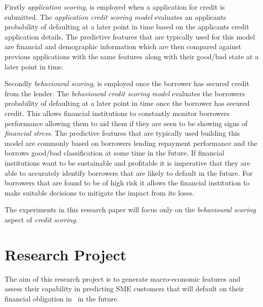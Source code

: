 Firstly \textit{application scoring}, is employed when a application for credit is submitted. The \textit{application credit scoring model} evaluates an applicants probability of defaulting at a later point in time based on the applicants credit application details. The predictive features that are typically used for this model are financial and demographic information which are then compared against previous applications with the same features along with their good/bad state at a later point in time.

Secondly \textit{behavioural scoring}, is employed once the borrower has secured credit from the lender. The \textit{behavioural credit scoring model} evaluates the borrowers probability of defaulting at a later point in time once the borrower has secured credit. This allows financial institutions to constantly monitor borrowers performance allowing them to aid them if they are seen to be showing signs of \textit{financial stress}. The predictive features that are typically used building this model are commonly based on borrowers lending repayment performance and the borrows good/bad classification at some time in the future. If financial institutions want to be sustainable and profitable it is imperative that they are able to accurately identify borrowers that are likely to default in the future. For borrowers that are found to be of high risk it allows the financial institution to make suitable decisions to mitigate the impact from its loses.

The experiments in this research paper will focus only on the \textit{behavioural scoring} aspect of \textit{credit scoring}.


\section{Research Project}

The aim of this research project is to generate macro-economic features and assess their capability in predicting SME customers that will default on  their financial obligation in \subjectname\ in the future.


